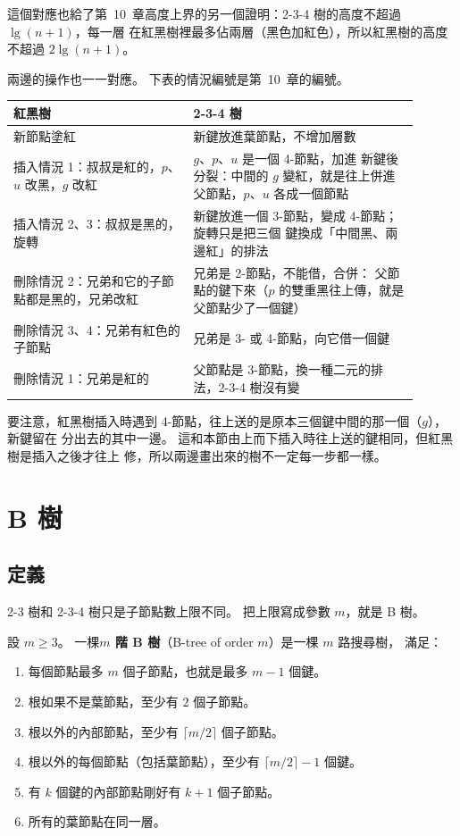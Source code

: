 這個對應也給了第~10~章高度上界的另一個證明：2-3-4 樹的高度不超過 $\lg(n+1)$，每一層
在紅黑樹裡最多佔兩層（黑色加紅色），所以紅黑樹的高度不超過 $2\lg(n+1)$。

兩邊的操作也一一對應。 下表的情況編號是第~10~章的編號。

\begin{center}
\begin{tabular}{p{0.40\linewidth}p{0.50\linewidth}}
\toprule
紅黑樹 & 2-3-4 樹 \\
\midrule
新節點塗紅 & 新鍵放進葉節點，不增加層數 \\
插入情況 1：叔叔是紅的，$p$、$u$ 改黑，$g$ 改紅 & $g$、$p$、$u$ 是一個 4-節點，加進
新鍵後分裂：中間的 $g$ 變紅，就是往上併進父節點，$p$、$u$ 各成一個節點 \\
插入情況 2、3：叔叔是黑的，旋轉 & 新鍵放進一個 3-節點，變成 4-節點；旋轉只是把三個
鍵換成「中間黑、兩邊紅」的排法 \\
刪除情況 2：兄弟和它的子節點都是黑的，兄弟改紅 & 兄弟是 2-節點，不能借，合併：
父節點的鍵下來（$p$ 的雙重黑往上傳，就是父節點少了一個鍵） \\
刪除情況 3、4：兄弟有紅色的子節點 & 兄弟是 3- 或 4-節點，向它借一個鍵 \\
刪除情況 1：兄弟是紅的 & 父節點是 3-節點，換一種二元的排法，2-3-4 樹沒有變 \\
\bottomrule
\end{tabular}
\end{center}

要注意，紅黑樹插入時遇到 4-節點，往上送的是原本三個鍵中間的那一個（$g$），新鍵留在
分出去的其中一邊。 這和本節由上而下插入時往上送的鍵相同，但紅黑樹是插入之後才往上
修，所以兩邊畫出來的樹不一定每一步都一樣。

\section{B 樹}
\label{sec:mw-btree}

\subsection{定義}

2-3 樹和 2-3-4 樹只是子節點數上限不同。 把上限寫成參數 $m$，就是 B 樹。

\begin{definition}[$m$ 階 B 樹]
\label{def:mw-btree}
設 $m \ge 3$。 一棵\textbf{$m$ 階 B 樹}（B-tree of order $m$）是一棵 $m$ 路搜尋樹，
滿足：
\begin{enumerate}
\item 每個節點最多 $m$ 個子節點，也就是最多 $m - 1$ 個鍵。
\item 根如果不是葉節點，至少有 $2$ 個子節點。
\item 根以外的內部節點，至少有 $\lceil m/2 \rceil$ 個子節點。
\item 根以外的每個節點（包括葉節點），至少有 $\lceil m/2 \rceil - 1$ 個鍵。
\item 有 $k$ 個鍵的內部節點剛好有 $k + 1$ 個子節點。
\item 所有的葉節點在同一層。
\end{enumerate}
\end{definition}

